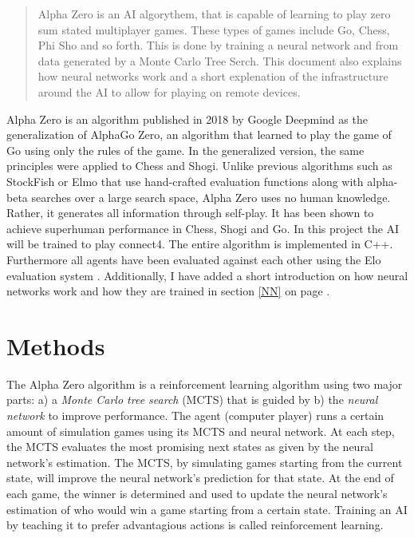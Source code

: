 \documentclass[12pt]{article}
\newcommand{\sectionref}[1]{section \ref{#1} on page \pageref{#1}}
\begin{document}
\maketitle
\begin{abstract}
\noindent Alpha Zero is an AI algorythem, that is capable of learning to play zero sum stated multiplayer games. These types of games include Go, Chess, Phi Sho and so forth. This is done by training a neural network and from data generated by a Monte Carlo Tree Serch. This document also explains how neural networks work and a short explenation of the infrastructure around the AI to allow for playing on remote devices.
~\cite{silver2018general}\cite{silver2017mastering}
\end{abstract}
\newpage
\tableofcontents
\newpage

Alpha Zero is an algorithm published in 2018 by Google Deepmind as the generalization of AlphaGo Zero, an algorithm that learned to play the game of Go using only the rules of the game. In the generalized version, the same principles were applied to Chess and Shogi. Unlike previous algorithms such as StockFish or Elmo that use hand-crafted evaluation functions along with alpha-beta searches over a large search space, Alpha Zero uses no human knowledge. Rather, it generates all information through self-play. It has been shown to achieve superhuman performance in Chess, Shogi and Go. In this project the AI will be trained to play connect4. The entire algorithm is implemented in C++. Furthermore all agents have been evaluated against each other using the Elo evaluation system \cite{elo1978rating}. Additionally, I have added a short introduction on how neural networks work and how they are trained in \sectionref{NN}. 

\section{Methods}
\label{Methods}
The Alpha Zero algorithm is a reinforcement learning algorithm using two major parts: a) a {\it Monte Carlo tree search} (MCTS) that is guided by b) the {\it neural network} to improve performance.
The agent (computer player) runs a certain amount of simulation games using its MCTS and neural network. At each step, the MCTS evaluates the most promising next states as given by the neural network's estimation. The MCTS, by simulating games starting from the current state, will improve the neural network's prediction for that state. At the end of each game, the winner is determined and used to update the neural network's estimation of who would win a game starting from a certain state. Training an AI by teaching it to prefer advantagious actions is called reinforcement learning.
\end{document}
